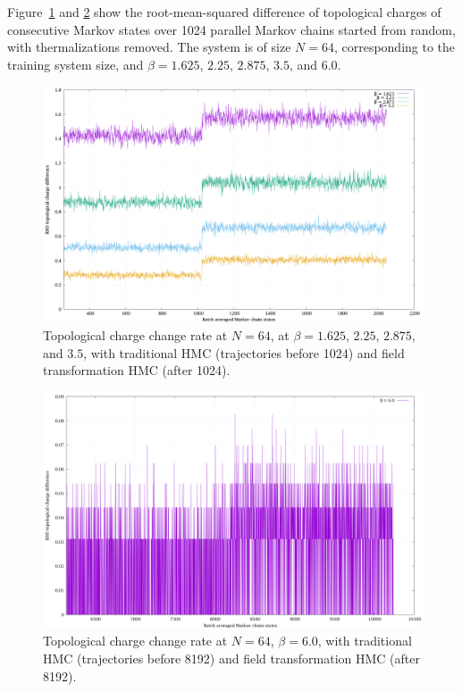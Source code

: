 Figure~\ref{topo-diff-n64} and \ref{topo-diff-n64-b6} show the root-mean-squared
difference of topological charges of consecutive Markov states over 1024 parallel
Markov chains started from random, with thermalizations removed.
The system is of size $N=64$, corresponding to the training system size,
and $β=1.625$, $2.25$, $2.875$, $3.5$, and $6.0$.

\begin{figure}
	\centering
	\includegraphics[width=\textwidth]{../topodiffN64.png}
	\caption{\label{topo-diff-n64}Topological charge change rate at $N=64$,
		at $β=1.625$, $2.25$, $2.875$, and $3.5$,
		with traditional HMC (trajectories before 1024)
		and field transformation HMC (after 1024).}
\end{figure}

\begin{figure}
	\centering
	\includegraphics[width=\textwidth]{../topodiffN64_b6.png}
	\caption{\label{topo-diff-n64-b6}Topological charge change rate at $N=64$, $β=6.0$,
		with traditional HMC (trajectories before 8192)
		and field transformation HMC (after 8192).}
\end{figure}

